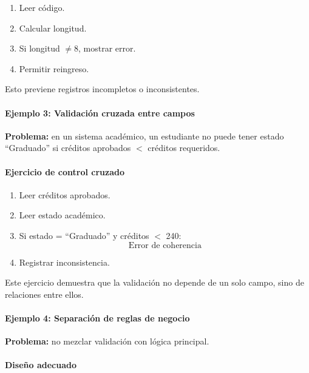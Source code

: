 \documentclass[12pt,twoside]{book}
\begin{document}
						\begin{enumerate}
							\item Leer código.
							\item Calcular longitud.
							\item Si longitud $\neq 8$, mostrar error.
							\item Permitir reingreso.
						\end{enumerate}
						
						\noindent
						Esto previene registros incompletos o inconsistentes.
						
						\paragraph{Ejemplo 3: Validación cruzada entre campos}
						
						\noindent
						\textbf{Problema:} en un sistema académico, un estudiante no puede tener estado ``Graduado'' si créditos aprobados $<$ créditos requeridos.
						
						\paragraph{Ejercicio de control cruzado}
						
						\begin{enumerate}
							\item Leer créditos aprobados.
							\item Leer estado académico.
							\item Si estado = ``Graduado'' y créditos $<$ 240:
							\[
							\text{Error de coherencia}
							\]
							\item Registrar inconsistencia.
						\end{enumerate}
						
						\noindent
						Este ejercicio demuestra que la validación no depende de un solo campo, sino de relaciones entre ellos.
						
						\paragraph{Ejemplo 4: Separación de reglas de negocio}
						
						\noindent
						\textbf{Problema:} no mezclar validación con lógica principal.
						
						\paragraph{Diseño adecuado}
						
\end{document}
